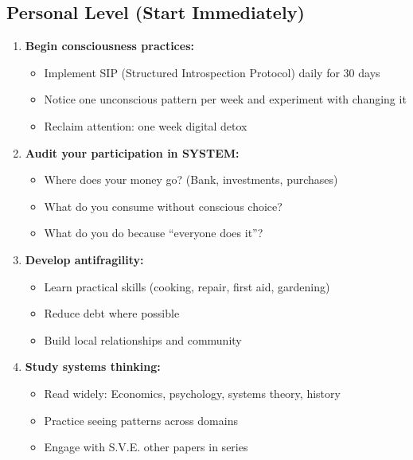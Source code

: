 \documentclass[11pt,a4paper]{article}
\theoremstyle{definition}
\theoremstyle{remark}
\begin{document}
\subsection{Personal Level (Start Immediately)}

\begin{enumerate}
    \item \textbf{Begin consciousness practices:}
    \begin{itemize}
        \item Implement SIP (Structured Introspection Protocol) daily for 30 days
        \item Notice one unconscious pattern per week and experiment with changing it
        \item Reclaim attention: one week digital detox
    \end{itemize}
    
    \item \textbf{Audit your participation in SYSTEM:}
    \begin{itemize}
        \item Where does your money go? (Bank, investments, purchases)
        \item What do you consume without conscious choice?
        \item What do you do because ``everyone does it''?
    \end{itemize}
    
    \item \textbf{Develop antifragility:}
    \begin{itemize}
        \item Learn practical skills (cooking, repair, first aid, gardening)
        \item Reduce debt where possible
        \item Build local relationships and community
    \end{itemize}
    
    \item \textbf{Study systems thinking:}
    \begin{itemize}
        \item Read widely: Economics, psychology, systems theory, history
        \item Practice seeing patterns across domains
        \item Engage with S.V.E. other papers in series
    \end{itemize}
\end{enumerate}
\end{document}
